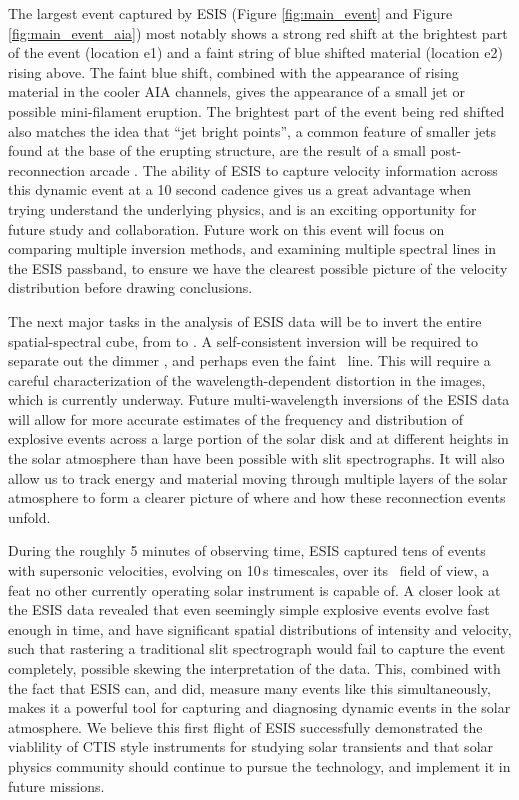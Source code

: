 	The largest event captured by ESIS (Figure \ref{fig:main_event} and Figure \ref{fig:main_event_aia}) most notably shows a strong red shift at the brightest part of the event (location e1) and a faint string of blue shifted material (location e2) rising above.
	The faint blue shift, combined with the appearance of rising material in the cooler AIA channels, gives the appearance of a small jet or possible mini-filament eruption.
	The brightest part of the event being red shifted also matches the idea that ``jet bright points'', a common feature of smaller jets found at the base of the erupting structure, are the result of a small post-reconnection arcade \citep[see][and references therein]{Sterling2015}.
	The ability of ESIS to capture velocity information across this dynamic event at a 10 second cadence gives us a great advantage when trying understand the underlying physics, and is an exciting opportunity for future study and collaboration.
	Future work on this event will focus on comparing multiple inversion methods, and examining multiple spectral lines in the ESIS passband, to ensure we have the clearest possible picture of the velocity distribution before drawing conclusions.
	
	The next major tasks in the analysis of ESIS data will be to invert the entire spatial-spectral cube, from  to . 
	A self-consistent inversion will be required to separate out the dimmer \mgxdim, and perhaps even the faint \oiii \ line. This will require a careful characterization of the wavelength-dependent distortion in the images, which is currently underway.
	Future multi-wavelength inversions of the ESIS data will allow for more accurate estimates of the frequency and distribution of explosive events across a large portion of the solar disk and at different heights in the solar atmosphere than have been possible with slit spectrographs.
	It will also allow us to track energy and material moving through multiple layers of the solar atmosphere to form a clearer picture of where and how these reconnection events unfold. 
	
	During the roughly 5 minutes of observing time, ESIS captured tens of events with supersonic velocities, evolving on 10\,s timescales, over its \esisfov \ field of view, a feat no other currently operating solar instrument is capable of.
	A closer look at the ESIS data revealed that even seemingly simple explosive events evolve fast enough in time, and have significant spatial distributions of intensity and velocity, such that rastering a traditional slit spectrograph would fail to capture the event completely, possible skewing the interpretation of the data. 
	This, combined with the fact that ESIS can, and did, measure many events like this simultaneously, makes it a powerful tool for capturing and diagnosing dynamic events in the solar atmosphere.
	We believe this first flight of ESIS successfully demonstrated the viablility of CTIS style instruments for studying solar transients and that solar physics community should continue to pursue the technology, and implement it in future missions. 
	
	
	

	  

